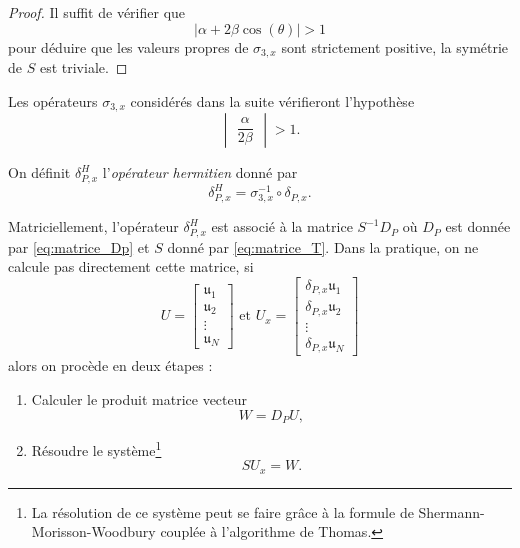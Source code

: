 \begin{proof}
Il suffit de vérifier que 
\begin{equation}
| \alpha + 2 \beta \cos \left( \theta \right) | > 1
\end{equation}
pour déduire que les valeurs propres de $\sigma_{3,x}$ sont strictement positive, la symétrie de $S$ est triviale.
\end{proof}

Les opérateurs $\sigma_{3,x}$ considérés dans la suite vérifieront l'hypothèse 
\begin{equation}
\begin{vmatrix}
\dfrac{\alpha}{2 \beta}
\end{vmatrix} > 1.
\end{equation}

\begin{definition}
On définit $\delta_{P,x}^H$ l'\textit{opérateur hermitien} donné par 
\begin{equation}
\delta_{P,x}^H = \sigma_{3,x}^{-1} \circ \delta_{P,x}.
\end{equation}
\end{definition}

Matriciellement, l'opérateur $\delta_{P,x}^H$ est associé à la matrice $S^{-1} D_P$ où $D_P$ est donnée par \eqref{eq:matrice_Dp} et $S$ donné par \eqref{eq:matrice_T}. Dans la pratique, on ne calcule pas directement cette matrice, si
\begin{equation}
U = \begin{bmatrix}
\mathfrak{u}_1 \\
\mathfrak{u}_2 \\
\vdots \\
\mathfrak{u}_N 
\end{bmatrix} \text{ et } 
U_x = \begin{bmatrix}
\delta_{P,x}\mathfrak{u}_1 \\
\delta_{P,x}\mathfrak{u}_2 \\
\vdots \\
\delta_{P,x}\mathfrak{u}_N 
\end{bmatrix}
\end{equation}
alors on procède en deux étapes :
\begin{enumerate}
\item Calculer le produit matrice vecteur 
\begin{equation}
W = D_P U,
\end{equation}
\item Résoudre le système\footnote{La résolution de ce système peut se faire grâce à la formule de Shermann-Morisson-Woodbury couplée à l'algorithme de Thomas.} 
\begin{equation}
S U_x = W.
\end{equation}
\end{enumerate}

